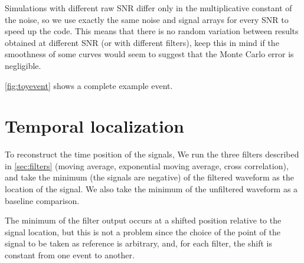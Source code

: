 
Simulations with different raw SNR differ only in the multiplicative constant
of the noise, so we use exactly the same noise and signal arrays for every SNR
to speed up the code. This means that there is no random variation between
results obtained at different SNR (or with different filters), keep this in
mind if the smoothness of some curves would seem to suggest that the Monte
Carlo error is negligible.


\autoref{fig:toyevent} shows a complete example event.

\begin{figure}
    
    

\end{figure}

\section{Temporal localization}
\label{sec:temploc}

To reconstruct the time position of the signals, We run the three filters
described in \autoref{sec:filters} (moving average, exponential moving average,
cross correlation), and take the minimum (the signals are negative) of the
filtered waveform as the location of the signal. We also take the minimum of
the unfiltered waveform as a baseline comparison.

The minimum of the filter output occurs at a shifted position relative to the
signal location, but this is not a problem since the choice of the point of the
signal to be taken as reference is arbitrary, and, for each filter, the shift
is constant from one event to another.

